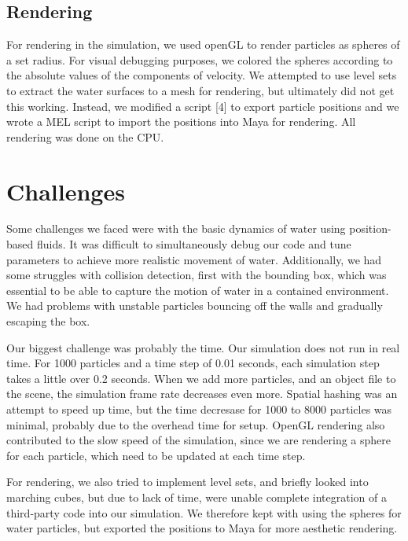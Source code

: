 \documentclass[conference]{IEEEtran}
\begin{document}
\subsection*{Rendering}
For rendering in the simulation, we used openGL to render particles as spheres of a set radius. For visual debugging purposes, we colored the spheres according to the absolute values of the components of velocity. We attempted to use level sets to extract the water surfaces to a mesh for rendering, but ultimately did not get this working. Instead, we modified a script [4] to export particle positions and we wrote a MEL script to import the positions into Maya for rendering. All rendering was done on the CPU. 
\section{Challenges} 
Some challenges we faced were with the basic dynamics of water using position-based fluids. It was difficult to simultaneously debug our code and tune parameters to achieve more realistic movement of water. Additionally, we had some struggles with collision detection, first with the bounding box, which was essential to be able to capture the motion of water in a contained environment. We had problems with unstable particles bouncing off the walls and gradually escaping the box. 

Our biggest challenge was probably the time. Our simulation does not run in real time. For 1000 particles and a time step of 0.01 seconds, each simulation step takes a little over 0.2 seconds. When we add more particles, and an object file to the scene, the simulation frame rate decreases even more. Spatial hashing was an attempt to speed up time, but the time decresase for 1000 to 8000 particles was minimal, probably due to the overhead time for setup. OpenGL rendering also contributed to the slow speed of the simulation, since we are rendering a sphere for each particle, which need to be updated at each time step. 

For rendering, we also tried to implement level sets, and briefly looked into marching cubes, but due to lack of time, were unable complete integration of a third-party code into our simulation. We therefore kept with using the spheres for water particles, but exported the positions to Maya for more aesthetic rendering. 
\end{document}
